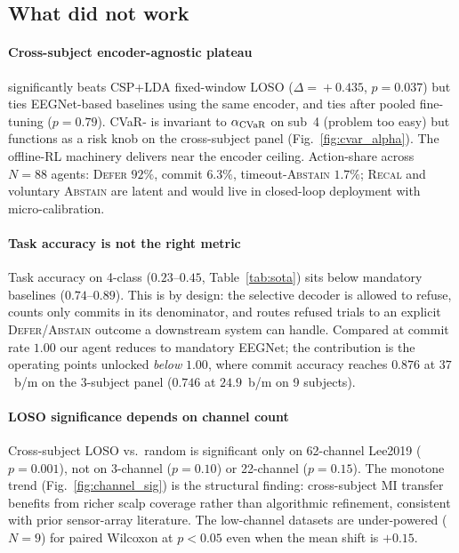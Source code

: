 \subsection{What did not work}\label{sec:disc:notworked}

\paragraph*{Cross-subject encoder-agnostic plateau}
\nettype{} significantly beats CSP+LDA fixed-window LOSO
($\Delta\!=\!+0.435$, $p\!=\!0.037$) but ties EEGNet-based
baselines using the same encoder, and ties \labram{} after pooled
fine-tuning ($p\!=\!0.79$). CVaR-\cql{} is invariant to
$\alpha_{\mathrm{CVaR}}$ on \bcib{} sub~4 (problem too easy) but
functions as a risk knob on the cross-subject panel
(Fig.~\ref{fig:cvar_alpha}). The offline-RL machinery delivers
near the encoder ceiling. Action-share across $N\!=\!88$ agents:
\textsc{Defer} $92\%$, commit $6.3\%$, timeout-\textsc{Abstain}
$1.7\%$; \textsc{Recal} and voluntary \textsc{Abstain} are latent
and would live in closed-loop deployment with micro-calibration.

\paragraph*{Task accuracy is not the right metric}
Task accuracy on \bcia{} 4-class ($0.23$--$0.45$, Table~\ref{tab:sota})
sits below mandatory baselines ($0.74$--$0.89$). This is by
design: the selective decoder is allowed to refuse, counts only
commits in its denominator, and routes refused trials to an
explicit \textsc{Defer}/\textsc{Abstain} outcome a downstream
system can handle. Compared at commit rate $1.00$ our agent
reduces to mandatory EEGNet; the contribution is the operating
points unlocked \emph{below} $1.00$, where commit accuracy reaches
$0.876$ at $37$~b/m on the 3-subject panel
($0.746$ at $24.9$~b/m on 9 subjects).

\paragraph*{LOSO significance depends on channel count}
Cross-subject LOSO vs.\ random is significant only on 62-channel
Lee2019 ($p\!=\!0.001$), not on 3-channel \bcib{} ($p\!=\!0.10$)
or 22-channel \bcia{} ($p\!=\!0.15$). The monotone trend
(Fig.~\ref{fig:channel_sig}) is the structural finding:
cross-subject MI transfer benefits from richer scalp coverage
rather than algorithmic refinement, consistent with prior
sensor-array literature. The low-channel datasets are
under-powered ($N\!=\!9$) for paired Wilcoxon at $p\!<\!0.05$ even
when the mean shift is $+0.15$.

